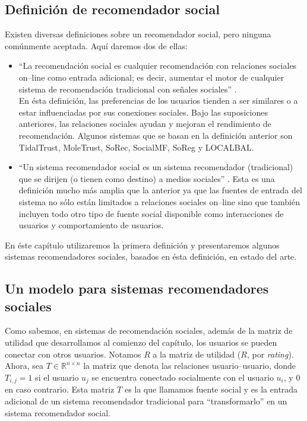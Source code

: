 	\subsection{Definición de recomendador social}
		Existen diversas definiciones sobre un recomendador social, pero ninguna comúnmente aceptada. Aquí daremos dos de ellas:
		\begin{itemize}
			\item \enquote{La recomendación social es cualquier recomendación con relaciones sociales on--line como entrada adicional; es decir, aumentar el motor de cualquier sistema de recomendación tradicional con señales sociales} \cite{king2010}. \\
				En ésta definición, las preferencias de los usuarios tienden a ser similares o a estar influenciadas por sus conexiones sociales. Bajo las suposiciones anteriores, las relaciones sociales ayudan y mejoran el rendimiento de recomendación. Algunos sistemas que se basan en la definición anterior son TidalTrust, MoleTrust, SoRec, SocialMF, SoReg y LOCALBAL.
			\item \enquote{Un sistema recomendador social es un sistema recomendador (tradicional) que se dirijen (o tienen como destino) a medios sociales} \cite{guy2011}. Esta es una definición mucho más amplia que la anterior ya que las fuentes de entrada del sistema no sólo están limitados a relaciones sociales on--line sino que también incluyen todo otro tipo de fuente social disponible como interacciones de usuarios y comportamiento de usuarios.
		\end{itemize}
		
		En éste capítulo utilizaremos la primera definición y presentaremos algunos sistemas recomendadores sociales, basados en ésta definición, en estado del arte.
	
	\subsection{Un modelo para sistemas recomendadores sociales}
		Como sabemos, en sistemas de recomendación sociales, además de la matriz de utilidad que desarrollamos al comienzo del capítulo, los usuarios se pueden conectar con otros usuarios. Notamos $R$ a la matriz de utilidad ($R$, por \textit{rating}). Ahora, sea $T \in \mathbb{R}^{n \times n}$ la matriz que denota las relaciones usuario--usuario, donde $T_{i,j} = 1$ si el usuario $u_j$ se encuentra conectado socialmente con el usuario $u_i$, y 0 en caso contrario. Esta matriz $T$ es la que llamamos fuente social y es la entrada adicional de un sistema recomendador tradicional para \enquote{transformarlo} en un sistema recomendador social. \par
		
